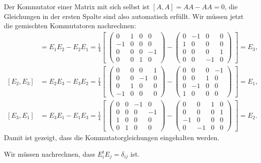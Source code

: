 \begin{loesung}
\begin{teilaufgaben}
\item
Der Kommutator einer Matrix mit sich selbst ist $[A,A]=AA-AA=0$, die
Gleichungen in der ersten Spalte sind also automatisch erfüllt.
Wir müssen jetzt die gemischten Kommutatoren nachrechnen:
\begin{align*}
[E_1,E_2]&=E_1E_2-E_2E_1=\frac14\left[\;
\begin{pmatrix}
 0& 1& 0& 0\\
-1& 0& 0& 0\\
 0& 0& 0&-1\\
 0& 0& 1& 0
\end{pmatrix}
-
\begin{pmatrix}
 0&-1& 0& 0\\
 1& 0& 0& 0\\
 0& 0& 0& 1\\
 0& 0&-1& 0
\end{pmatrix}\;
\right]
=E_3,
\\
[E_2,E_3]&=E_2E_3-E_3E_2=\frac14\left[\;
\begin{pmatrix}
 0& 0& 0& 1\\
 0& 0&-1& 0\\
 0& 1& 0& 0\\
-1& 0& 0& 0
\end{pmatrix}
-
\begin{pmatrix}
 0& 0& 0&-1\\
 0& 0& 1& 0\\
 0&-1& 0& 0\\
 1& 0& 0& 0
\end{pmatrix}\;
\right]
=E_1,
\\
[E_3,E_1]&=E_3E_1-E_1E_3=\frac14\left[\;
\begin{pmatrix}
 0& 0&-1& 0\\
 0& 0& 0&-1\\
 1& 0& 0& 0\\
 0& 1& 0& 0
\end{pmatrix}
-
\begin{pmatrix}
 0& 0& 1& 0\\
 0& 0& 0& 1\\
-1& 0& 0& 0\\
 0&-1& 0& 0
\end{pmatrix}\;
\right]
=E_2.
\end{align*}
Damit ist gezeigt, dass die Kommutatorgleichungen eingehalten werden.
\item
Wir müssen nachrechnen, dass $E_i^tE_j=\delta_{ij}$ ist.

\end{teilaufgaben}
\end{loesung}
